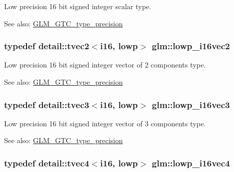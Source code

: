 Low precision 16 bit signed integer scalar type. \begin{Desc}
\item[See also:]\hyperlink{group__gtc__type__precision}{GLM\_\-GTC\_\-type\_\-precision} \end{Desc}
\hypertarget{group__gtc__type__precision_g47c5d4c919266799ecc76d832356feff}{
\subsubsection[lowp\_\-i16vec2]{\setlength{\rightskip}{0pt plus 5cm}typedef detail::tvec2$<$i16, lowp$>$ {\bf glm::lowp\_\-i16vec2}}}
\label{group__gtc__type__precision_g47c5d4c919266799ecc76d832356feff}


Low precision 16 bit signed integer vector of 2 components type. \begin{Desc}
\item[See also:]\hyperlink{group__gtc__type__precision}{GLM\_\-GTC\_\-type\_\-precision} \end{Desc}
\hypertarget{group__gtc__type__precision_g5b71f24a26316aa21f3c58d25c8db9a8}{
\subsubsection[lowp\_\-i16vec3]{\setlength{\rightskip}{0pt plus 5cm}typedef detail::tvec3$<$i16, lowp$>$ {\bf glm::lowp\_\-i16vec3}}}
\label{group__gtc__type__precision_g5b71f24a26316aa21f3c58d25c8db9a8}


Low precision 16 bit signed integer vector of 3 components type. \begin{Desc}
\item[See also:]\hyperlink{group__gtc__type__precision}{GLM\_\-GTC\_\-type\_\-precision} \end{Desc}
\hypertarget{group__gtc__type__precision_g59ea63973187e1e990fb6633d1800c6d}{
\subsubsection[lowp\_\-i16vec4]{\setlength{\rightskip}{0pt plus 5cm}typedef detail::tvec4$<$i16, lowp$>$ {\bf glm::lowp\_\-i16vec4}}}
\label{group__gtc__type__precision_g59ea63973187e1e990fb6633d1800c6d}


